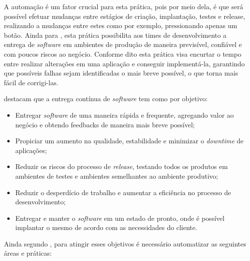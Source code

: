 \documentclass[twoside,english,brazilian]{UNISINOSartigo}
\begin{document}
A automação é um fator crucial para esta prática, pois por meio dela, é que será possível efetuar mudanças entre estágios de criação, implantação, testes e release, realizando a mudanças entre estes como por exemplo, pressionando apenas um botão. 
Ainda para , esta prática possibilita aos times de desenvolvimento a entrega de \textit{software} em ambientes de produção de maneira previsível, confiável e com poucos riscos ao negócio. Conforme dito esta prática visa encurtar o tempo entre realizar alterações em uma aplicação e conseguir implementá-la, garantindo que possíveis falhas sejam identificadas o mais breve possível, o que torna mais fácil de corrigi-las.

 destacam que a entrega contínua de \textit{software} tem como por objetivo:
\begin{itemize}
\item Entregar \textit{software} de uma maneira rápida e frequente, agregando valor ao negócio e obtendo feedbacks de maneira mais breve possível;
\item Propiciar um aumento na qualidade, estabilidade  e minimizar o \textit{downtime} de aplicações;
\item Reduzir os riscos do processo de \textit{release}, testando todos os produtos em ambientes de testes e ambientes semelhantes ao ambiente produtivo;
\item Reduzir o desperdício de trabalho e aumentar a eficiência no processo de desenvolvimento;
\item Entregar e manter o \textit{software} em um estado de pronto, onde é possível implantar o mesmo de acordo com as necessidades do cliente.
\end{itemize}
Ainda segundo , para atingir esses objetivos é  necessário automatizar as seguintes áreas e práticas:
\end{document}
